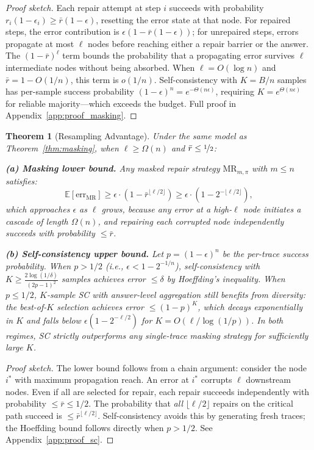 \documentclass{article}
\newtheorem{theorem}{Theorem}
\begin{document}
\begin{proof}[Proof sketch]
Each repair attempt at step $i$ succeeds with probability $r_i(1-\epsilon_i) \geq \bar{r}(1-\epsilon)$, resetting the error state at that node. For repaired steps, the error contribution is $\epsilon(1-\bar{r}(1-\epsilon))$; for unrepaired steps, errors propagate at most $\ell$ nodes before reaching either a repair barrier or the answer. The $(1-\bar{r})^\ell$ term bounds the probability that a propagating error survives $\ell$ intermediate nodes without being absorbed. When $\ell = O(\log n)$ and $\bar{r} = 1-O(1/n)$, this term is $o(1/n)$. Self-consistency with $K = B/n$ samples has per-sample success probability $(1-\epsilon)^n = e^{-\Theta(n\epsilon)}$, requiring $K = e^{\Theta(n\epsilon)}$ for reliable majority---which exceeds the budget. Full proof in Appendix~\ref{app:proof_masking}.
\end{proof}

\begin{theorem}[Resampling Advantage]
\label{thm:sc}
Under the same model as Theorem~\ref{thm:masking}, when $\ell \geq \Omega(n)$ and $\bar{r} \leq \nicefrac{1}{2}$:

\textbf{(a) Masking lower bound.} Any masked repair strategy $\text{MR}_{m,\pi}$ with $m \leq n$ satisfies:
\begin{equation}
\mathbb{E}[\text{err}_{\text{MR}}] \geq \epsilon \cdot \left(1 - \bar{r}^{\lfloor\ell/2\rfloor}\right) \geq \epsilon \cdot \left(1 - 2^{-\lfloor\ell/2\rfloor}\right),
\end{equation}
which approaches $\epsilon$ as $\ell$ grows, because any error at a high-$\ell$ node initiates a cascade of length $\Omega(n)$, and repairing each corrupted node independently succeeds with probability $\leq \bar{r}$.

\textbf{(b) Self-consistency upper bound.} Let $p = (1-\epsilon)^n$ be the per-trace success probability. When $p > 1/2$ (i.e., $\epsilon < 1 - 2^{-1/n}$), self-consistency with $K \geq \frac{2\log(1/\delta)}{(2p-1)^2}$ samples achieves error $\leq \delta$ by Hoeffding's inequality. When $p \leq 1/2$, $K$-sample SC with answer-level aggregation still benefits from diversity: the best-of-$K$ selection achieves error $\leq (1-p)^K$, which decays exponentially in $K$ and falls below $\epsilon(1 - 2^{-\ell/2})$ for $K = O(\ell / \log(1/p))$. In both regimes, SC strictly outperforms any single-trace masking strategy for sufficiently large $K$.
\end{theorem}

\begin{proof}[Proof sketch]
The lower bound follows from a chain argument: consider the node $i^*$ with maximum propagation reach. An error at $i^*$ corrupts $\ell$ downstream nodes. Even if all are selected for repair, each repair succeeds independently with probability $\leq \bar{r} \leq 1/2$. The probability that \emph{all} $\lfloor\ell/2\rfloor$ repairs on the critical path succeed is $\leq \bar{r}^{\lfloor\ell/2\rfloor}$. Self-consistency avoids this by generating fresh traces; the Hoeffding bound follows directly when $p > 1/2$. See Appendix~\ref{app:proof_sc}.
\end{proof}
\end{document}
